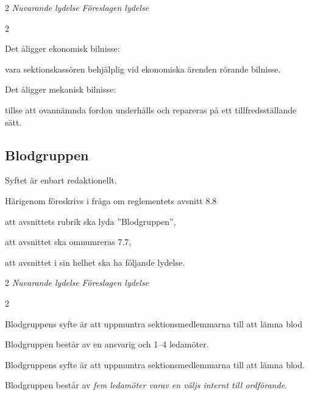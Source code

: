 \documentclass{article}
\newenvironment{lydelse}
    {\begin{paracol}{2}%
        \emph{Nuvarande lydelse}%
        \switchcolumn%
        \emph{Föreslagen lydelse}%
    \end{paracol}%
    \begin{enumerate}[label=\thesubsection.\arabic*]%
    \begin{paracol}{2}%
    }{\end{paracol}\end{enumerate}}
\begin{document}
\begin{lydelse}
    \item Det åligger ekonomisk bilnisse:
    \begin{aligganden}
        \vspace{-0.4em}
        \item vara sektionskassören behjälplig vid ekonomiska ärenden rörande bilnisse.
    \end{aligganden}
    
    \item Det åligger mekanisk bilnisse:
    \begin{aligganden}
        \vspace{-0.4em}
        \item tillse att ovannämnda fordon underhålls och repareras på ett tillfredsställande sätt.
    \end{aligganden}
    
\end{lydelse}

\subsection{Blodgruppen}
Syftet är enbart redaktionellt.

Härigenom föreskrivs i fråga om reglementets avsnitt 8.8

\begin{dels}
    \item att avsnittets rubrik ska lyda ''Blodgruppen'',
    \item att avsnittet ska omnumreras 7.7,
    \item att avsnittet i sin helhet ska ha följande lydelse.
\end{dels}
\begin{lydelse}
    \setcounter{section}{8}
    \setcounter{subsection}{8}
    
    \item Blodgruppens syfte är att uppmuntra sektionsmedlemmarna till att lämna blod

	\item Blodgruppen består av en ansvarig och 1--4 ledamöter.
    
    \setcounter{section}{7}
    \setcounter{subsection}{7}
    \switchcolumn
    
    \item Blodgruppens syfte är att uppmuntra sektionsmedlemmarna till att lämna blod.

    \item Blodgruppen består av \emph{fem ledamöter varav en väljs internt till ordförande}.
    
\end{lydelse}
\end{document}
